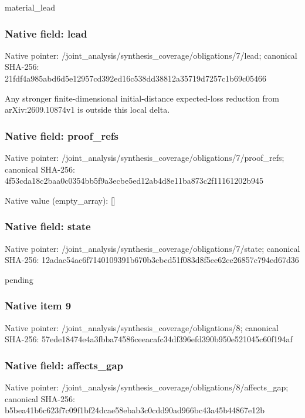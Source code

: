 \documentclass[10pt,a4paper]{article}
\begin{document}
\begingroup\raggedright\sloppy material\_\allowbreak{}lead\par\endgroup

\subsubsection{Native field: lead}
Native pointer: /joint\_\allowbreak{}analysis/synthesis\_\allowbreak{}coverage/obligations/7/lead; canonical SHA-256: 21fdf4a985abd6d5e12957cd392ed16c538dd38812a35719d7257c1b69c05466

\begingroup\raggedright\sloppy Any stronger finite-dimensional initial-distance expected-loss reduction from arXiv:\allowbreak{}2609.10874v1 is outside this local delta.\par\endgroup

\subsubsection{Native field: proof\_\allowbreak{}refs}
Native pointer: /joint\_\allowbreak{}analysis/synthesis\_\allowbreak{}coverage/obligations/7/proof\_\allowbreak{}refs; canonical SHA-256: 4f53cda18c2baa0c0354bb5f9a3ecbe5ed12ab4d8e11ba873c2f11161202b945

Native value (empty\_\allowbreak{}array): []

\subsubsection{Native field: state}
Native pointer: /joint\_\allowbreak{}analysis/synthesis\_\allowbreak{}coverage/obligations/7/state; canonical SHA-256: 12adac54ac6f7140109391b670b3cbcd51f083d8f5ee62ce26857c794ed67d36

\begingroup\raggedright\sloppy pending\par\endgroup

\subsubsection{Native item 9}
Native pointer: /joint\_\allowbreak{}analysis/synthesis\_\allowbreak{}coverage/obligations/8; canonical SHA-256: 57ede18474e4a3fbba74586ceeacafc34df396efd390b950e521045c60f194af

\subsubsection{Native field: affects\_\allowbreak{}gap}
Native pointer: /joint\_\allowbreak{}analysis/synthesis\_\allowbreak{}coverage/obligations/8/affects\_\allowbreak{}gap; canonical SHA-256: b5bea41b6c623f7c09f1bf24dcae58ebab3c0cdd90ad966bc43a45b44867e12b
\end{document}
